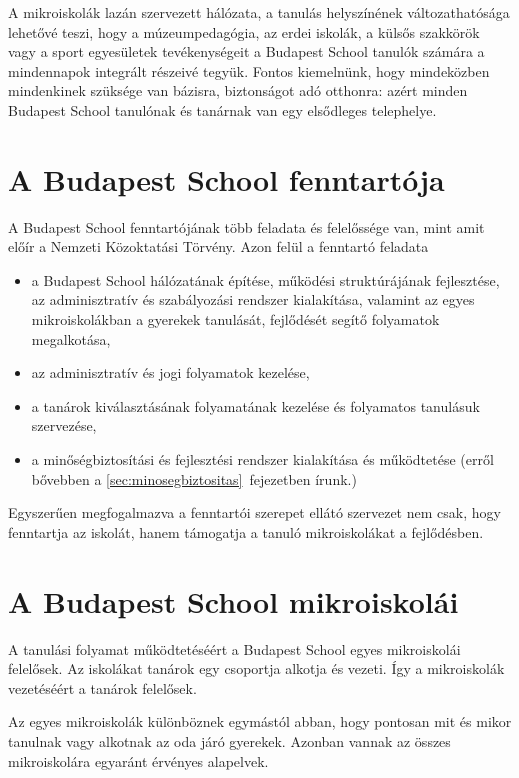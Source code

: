A mikroiskolák lazán szervezett hálózata, a tanulás helyszínének változathatósága lehetővé teszi, hogy a múzeumpedagógia, az erdei iskolák, a külsős szakkörök vagy a sport egyesületek tevékenységeit a Budapest School tanulók számára a mindennapok integrált részeivé tegyük. Fontos kiemelnünk, hogy mindeközben mindenkinek szüksége van bázisra, biztonságot adó otthonra: azért minden Budapest School tanulónak és tanárnak van egy elsődleges telephelye.




  \section{A Budapest School fenntartója}
  A Budapest School fenntartójának több feladata és felelőssége van, mint amit előír a Nemzeti Közoktatási Törvény. Azon felül a fenntartó feladata
  \begin{itemize}
  \item a Budapest School hálózatának építése, működési struktúrájának
  fejlesztése, az adminisztratív és szabályozási rendszer kialakítása,
  valamint az egyes mikroiskolákban a gyerekek tanulását, fejlődését segítő
  folyamatok megalkotása,
  \item  az adminisztratív és jogi folyamatok kezelése,
  \item  a tanárok kiválasztásának folyamatának kezelése és folyamatos tanulásuk szervezése,
  \item a minőségbiztosítási és fejlesztési rendszer kialakítása és működtetése (erről bővebben a \ref{sec:minosegbiztositas}~fejezetben írunk.)
\end{itemize}

 Egyszerűen megfogalmazva a fenntartói szerepet ellátó szervezet nem csak, hogy fenntartja az iskolát, hanem támogatja a tanuló mikroiskolákat a fejlődésben.

  \section{A Budapest School mikroiskolái}

  A tanulási folyamat működtetéséért a Budapest School egyes mikroiskolái
  felelősek. Az iskolákat tanárok egy csoportja alkotja és vezeti. Így a
  mikroiskolák vezetéséért a tanárok felelősek.

  Az egyes mikroiskolák különböznek egymástól abban, hogy pontosan mit és mikor
  tanulnak vagy alkotnak az oda járó gyerekek. Azonban vannak az összes mikroiskolára
  egyaránt érvényes alapelvek.

